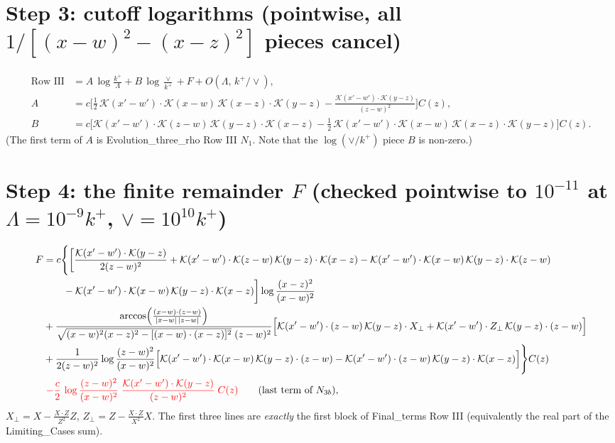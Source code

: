 \documentclass[10pt]{article}
\def\K{\mathcal{K}}
\begin{document}
\section{Step 3: cutoff logarithms (pointwise, all $1/[(x-w)^2-(x-z)^2]$ pieces cancel)}
\begin{align*}
\text{Row III}&=A\,\log\frac{k^{+}}{\Lambda}+B\,\log\frac{\vee}{k^{+}}+F+O(\Lambda,\,k^{+}/\vee),\\
A&=c\Big[\tfrac12\,\K(x'-w')\cdot\K(x-w)\,\K(x-z)\cdot\K(y-z)-\frac{\K(x'-w')\cdot\K(y-z)}{(z-w)^{2}}\Big]C(z),\\
B&=c\Big[\K(x'-w')\cdot\K(z-w)\,\K(y-z)\cdot\K(x-z)-\tfrac12\,\K(x'-w')\cdot\K(x-w)\,\K(x-z)\cdot\K(y-z)\Big]C(z).
\end{align*}
(The first term of $A$ is Evolution\_three\_rho Row III $N_1$. Note that the $\log(\vee/k^+)$ piece $B$ is non-zero.)

\section{Step 4: the finite remainder $F$ (checked pointwise to $10^{-11}$ at $\Lambda=10^{-9}k^+$, $\vee=10^{10}k^+$)}
\begin{align*}
F&=c\Bigg\{\bigg[\frac{\K(x'-w')\cdot\K(y-z)}{2(z-w)^{2}}+\K(x'-w')\cdot\K(z-w)\,\K(y-z)\cdot\K(x-z)
-\K(x'-w')\cdot\K(x-w)\,\K(y-z)\cdot\K(z-w)\\
&\qquad-\K(x'-w')\cdot\K(x-w)\,\K(y-z)\cdot\K(x-z)\bigg]\log\frac{(x-z)^{2}}{(x-w)^{2}}\\
&+\frac{\arccos\!\Big(\frac{(x-w)\cdot(z-w)}{|x-w|\,|z-w|}\Big)}{\sqrt{(x-w)^{2}(x-z)^{2}-[(x-w)\cdot(x-z)]^{2}}\;(z-w)^{2}}
\Big[\K(x'-w')\cdot(z-w)\,\K(y-z)\cdot X_\perp+\K(x'-w')\cdot Z_\perp\,\K(y-z)\cdot(z-w)\Big]\\
&+\frac{1}{2(z-w)^{2}}\log\frac{(z-w)^{2}}{(x-w)^{2}}\Big[\K(x'-w')\cdot\K(x-w)\,\K(y-z)\cdot(z-w)-\K(x'-w')\cdot(z-w)\,\K(y-z)\cdot\K(x-z)\Big]\Bigg\}C(z)\\
&\;\textcolor{red}{-\frac{c}{2}\,\log\frac{(z-w)^{2}}{(x-w)^{2}}\;\frac{\K(x'-w')\cdot\K(y-z)}{(z-w)^{2}}\;C(z)}\qquad(\text{last term of }N_{3b}),
\end{align*}
$X_\perp=X-\frac{X\cdot Z}{Z^2}Z$, $Z_\perp=Z-\frac{X\cdot Z}{X^2}X$.
The first three lines are \emph{exactly} the first block of Final\_terms Row III (equivalently the real part of the Limiting\_Cases sum). \checkmark
\end{document}
